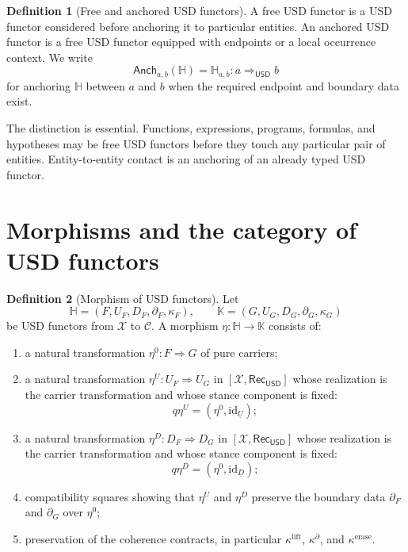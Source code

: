 \documentclass[11pt]{article}
\newcommand{\USD}{\mathsf{USD}}
\newcommand{\RecUSD}{\mathsf{Rec}_{\USD}}
\newcommand{\Anch}{\mathsf{Anch}}
\theoremstyle{definition}
\newtheorem{definition}{Definition}[section]
\theoremstyle{plain}
\begin{document}
\begin{definition}[Free and anchored USD functors]
A free USD functor is a USD functor considered before anchoring it to
particular entities.  An anchored USD functor is a free USD functor
equipped with endpoints or a local occurrence context.  We write
\[
  \Anch_{a,b}(\mathbb H)=\mathbb H_{a,b}:a\Rightarrow_{\USD}b
\]
for anchoring $\mathbb H$ between $a$ and $b$ when the required endpoint
and boundary data exist.
\end{definition}

The distinction is essential.  Functions, expressions, programs,
formulas, and hypotheses may be free USD functors before they touch any
particular pair of entities.  Entity-to-entity contact is an anchoring of
an already typed USD functor.

\section{Morphisms and the category of USD functors}

\begin{definition}[Morphism of USD functors]
Let
\[
  \mathbb H=(F,U_F,D_F,\partial_F,\kappa_F),\qquad
  \mathbb K=(G,U_G,D_G,\partial_G,\kappa_G)
\]
be USD functors from $\mathcal X$ to $\mathcal C$.  A morphism
$\eta:\mathbb H\to\mathbb K$ consists of:
\begin{enumerate}[label=(\roman*),leftmargin=*]
  \item a natural transformation $\eta^0:F\Rightarrow G$ of pure carriers;
  \item a natural transformation $\eta^U:U_F\Rightarrow U_G$ in
  $[\mathcal X,\RecUSD]$ whose realization is the carrier transformation
  and whose stance component is fixed:
  \[
    q\eta^U=(\eta^0,\mathrm{id}_{\underline U});
  \]
  \item a natural transformation $\eta^D:D_F\Rightarrow D_G$ in
  $[\mathcal X,\RecUSD]$ whose realization is the carrier transformation
  and whose stance component is fixed:
  \[
    q\eta^D=(\eta^0,\mathrm{id}_{\underline D});
  \]
  \item compatibility squares showing that $\eta^U$ and $\eta^D$ preserve
  the boundary data $\partial_F$ and $\partial_G$ over $\eta^0$;
  \item preservation of the coherence contracts, in particular
  $\kappa^{\mathrm{lift}}$, $\kappa^{\partial}$, and
  $\kappa^{\mathrm{erase}}$.
\end{enumerate}
\end{definition}
\end{document}
